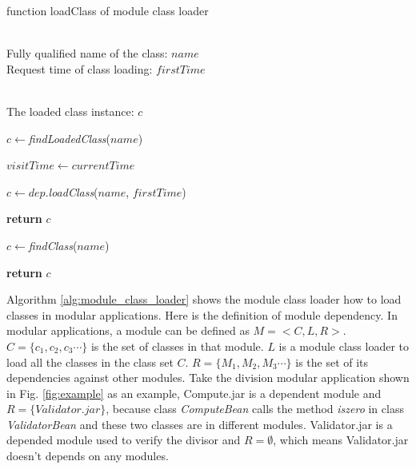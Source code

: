 \documentclass[conference]{IEEEtran}
\begin{document}
\begin{algorithm}[ht]
\caption{function loadClass of module class loader}
\label{alg:module_class_loader}
\begin{algorithmic}[1]
\REQUIRE ~~\\
Fully qualified name of the class: $name$ \\
Request time of class loading: $firstTime$

\ENSURE ~~\\
The loaded class instance: $c$

\STATE $c\leftarrow$\emph{findLoadedClass}($name$)


	\STATE $visitTime\leftarrow currentTime$
	
		
		\STATE $c\leftarrow dep.$\emph{loadClass}($name$, $firstTime$)
		
			
			\STATE \textbf{return} $c$

		\ENDIF
	
	\ENDFOR

	\STATE $c\leftarrow$\emph{findClass}($name$)

\ELSE
	
	\STATE \textbf{return} $c$

\ENDIF


\end{algorithmic}
\end{algorithm}


Algorithm \ref{alg:module_class_loader} shows the module class loader how to load classes in modular applications.
Here is the definition of module dependency.
In modular applications, a module can be defined as $M=<C, L, R>$. 
$C=\{c_1, c_2, c_3\cdots\}$ is the set of classes in that module. 
$L$ is a module class loader to load all the classes in the class set $C$.
$R=\{M_1, M_2, M_3\cdots\}$ is the set of its dependencies against other modules. 
Take the division modular application shown in Fig. \ref{fig:example} as an example, Compute.jar is a dependent module and $R = \{Validator.jar\}$, because class \emph{ComputeBean} calls the method \emph{iszero} in class \emph{ValidatorBean} and these two classes are in different modules.
Validator.jar is a depended module used to verify the divisor and $R = \emptyset$, which means Validator.jar doesn't depends on any modules.
\end{document}
